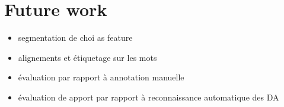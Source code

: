 

\section{Future work}
\label{sec:futureWork}

\begin{itemize}
\item segmentation de choi as feature
\item alignements et étiquetage sur les mots
\item évaluation par rapport à annotation manuelle
\item évaluation de apport par rapport à reconnaissance automatique des DA 
\end{itemize}
